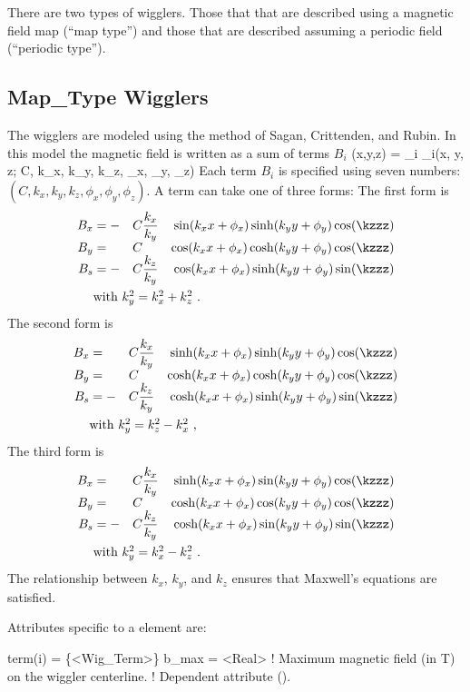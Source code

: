 {There are two types of wigglers. Those that that are described using a
magnetic field map (``map type'') and those that are described
assuming a periodic field (``periodic type''). 

\subsection{Map\_Type Wigglers}
\label{s:wiggler.map}

The  wigglers are modeled using the method of Sagan,
Crittenden, and Rubin\cite{b:wiggler}. In this model the magnetic
field is written as a sum of terms $B_i$
\Begineq
  \bfB(x,y,z) = \sum_i \bfB_i(x, y, z; C, k_x, k_y, k_z, \phi_x, \phi_y, \phi_z)
\Endeq 
Each term $B_i$ is specified using seven numbers: 
$(C, k_x, k_y, k_z, \phi_x, \phi_y, \phi_z)$. A term can take one of three forms: 
The first form is
\begin{alignat}{4}
  B_x &= -&C &\dfrac{k_x}{k_y} & \sin(\kxx) \sinh(\kyy) \cos(\kzzz) \CRNEG
  B_y &=  &C &                 & \cos(\kxx) \cosh(\kyy) \cos(\kzzz) \CRNEG
  B_s &= -&C &\dfrac{k_z}{k_y} & \cos(\kxx) \sinh(\kyy) \sin(\kzzz) \label{f1} \\
  & \makebox[1pt][l]{with $k_y^2 = k_x^2 + k_z^2$ .} &&&  \nonumber
\end{alignat}
The second form is
\begin{alignat}{4}
  B_x &=  &C &\dfrac{k_x}{k_y} & \sinh(\kxx) \sinh(\kyy) \cos(\kzzz) \CRNEG
  B_y &=  &C &                 & \cosh(\kxx) \cosh(\kyy) \cos(\kzzz) \CRNEG
  B_s &= -&C &\dfrac{k_z}{k_y} & \cosh(\kxx) \sinh(\kyy) \sin(\kzzz) \label{f2} \\
  & \makebox[1pt][l]{with $k_y^2 = k_z^2 - k_x^2$ ,} &&&  \nonumber
\end{alignat}
The third form is
\begin{alignat}{4}
  B_x &=  &C &\dfrac{k_x}{k_y} & \sinh(\kxx) \sin(\kyy) \cos(\kzzz) \CRNEG
  B_y &=  &C &                 & \cosh(\kxx) \cos(\kyy) \cos(\kzzz) \CRNEG
  B_s &= -&C &\dfrac{k_z}{k_y} & \cosh(\kxx) \sin(\kyy) \sin(\kzzz) \label{f3} \\
  & \makebox[1pt][l]{with $k_y^2 = k_x^2 - k_z^2$ .} &&& \nonumber
\end{alignat}
The relationship between $k_x$, $k_y$, and $k_z$ ensures that
Maxwell's equations are satisfied.

Attributes specific to a   element are:
\begin{example}
  term(i)  = \{<Wig_Term>\} 
  b_max    = <Real>   ! Maximum magnetic field (in T) on the wiggler centerline. 
                      !   Dependent attribute ().
\end{example}

}
